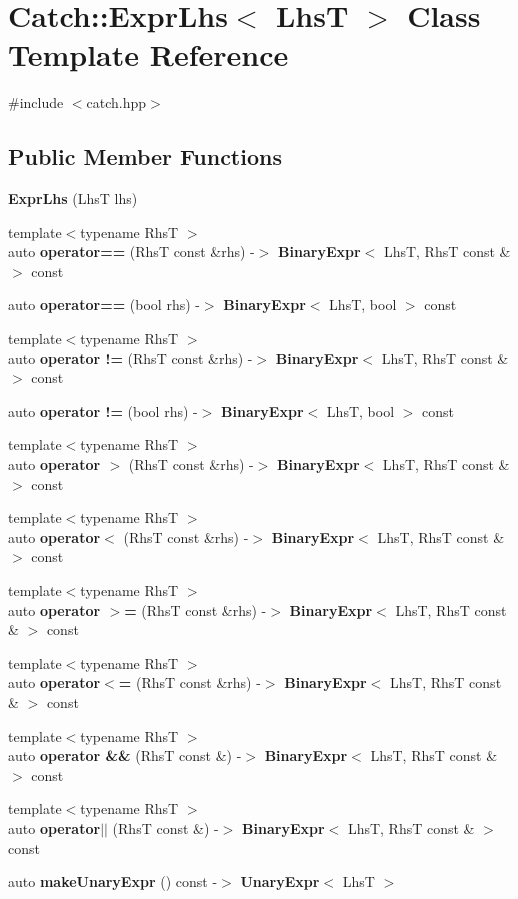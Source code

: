 \section{Catch\+::Expr\+Lhs$<$ LhsT $>$ Class Template Reference}
\label{class_catch_1_1_expr_lhs}


{\ttfamily \#include $<$catch.\+hpp$>$}

\subsection*{Public Member Functions}
\begin{DoxyCompactItemize}
\item 
\textbf{ Expr\+Lhs} (LhsT lhs)
\item 
{\footnotesize template$<$typename RhsT $>$ }\\auto \textbf{ operator==} (RhsT const \&rhs) -\/$>$ \textbf{ Binary\+Expr}$<$ LhsT, RhsT const \& $>$ const
\item 
auto \textbf{ operator==} (bool rhs) -\/$>$ \textbf{ Binary\+Expr}$<$ LhsT, bool $>$ const
\item 
{\footnotesize template$<$typename RhsT $>$ }\\auto \textbf{ operator !=} (RhsT const \&rhs) -\/$>$ \textbf{ Binary\+Expr}$<$ LhsT, RhsT const \& $>$ const
\item 
auto \textbf{ operator !=} (bool rhs) -\/$>$ \textbf{ Binary\+Expr}$<$ LhsT, bool $>$ const
\item 
{\footnotesize template$<$typename RhsT $>$ }\\auto \textbf{ operator $>$} (RhsT const \&rhs) -\/$>$ \textbf{ Binary\+Expr}$<$ LhsT, RhsT const \& $>$ const
\item 
{\footnotesize template$<$typename RhsT $>$ }\\auto \textbf{ operator$<$} (RhsT const \&rhs) -\/$>$ \textbf{ Binary\+Expr}$<$ LhsT, RhsT const \& $>$ const
\item 
{\footnotesize template$<$typename RhsT $>$ }\\auto \textbf{ operator $>$=} (RhsT const \&rhs) -\/$>$ \textbf{ Binary\+Expr}$<$ LhsT, RhsT const \& $>$ const
\item 
{\footnotesize template$<$typename RhsT $>$ }\\auto \textbf{ operator$<$=} (RhsT const \&rhs) -\/$>$ \textbf{ Binary\+Expr}$<$ LhsT, RhsT const \& $>$ const
\item 
{\footnotesize template$<$typename RhsT $>$ }\\auto \textbf{ operator \&\&} (RhsT const \&) -\/$>$ \textbf{ Binary\+Expr}$<$ LhsT, RhsT const \& $>$ const
\item 
{\footnotesize template$<$typename RhsT $>$ }\\auto \textbf{ operator$\vert$$\vert$} (RhsT const \&) -\/$>$ \textbf{ Binary\+Expr}$<$ LhsT, RhsT const \& $>$ const
\item 
auto \textbf{ make\+Unary\+Expr} () const -\/$>$ \textbf{ Unary\+Expr}$<$ LhsT $>$
\end{DoxyCompactItemize}
